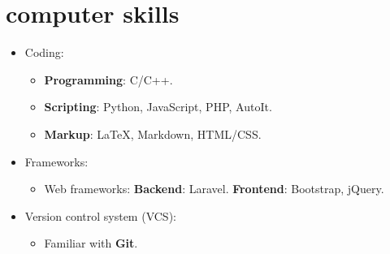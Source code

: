 \documentclass{article}
\begin{document}
\section{computer skills}
\begin{itemize}
\item Coding:
\begin{itemize}
\item \textbf{Programming}: C/C++.
\item \textbf{Scripting}: Python, JavaScript, PHP, AutoIt.
\item \textbf{Markup}: \LaTeX, Markdown, HTML/CSS.
\end{itemize}
\item Frameworks:
\begin{itemize}
\item Web frameworks:
\subitem \textbf{Backend}: Laravel.
\subitem \textbf{Frontend}: Bootstrap, jQuery.
\end{itemize}
\item Version control system (VCS):
\begin{itemize}
\item Familiar with \textbf{Git}.
\end{itemize}
\end{itemize}
\end{document}
